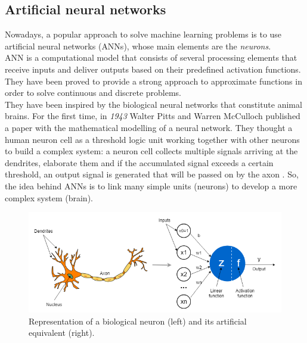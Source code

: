 \subsection{Artificial neural networks}
Nowadays, a popular approach to solve machine learning problems is to use artificial neural networks (\glspl{ANN}), whose main elements are the \emph{neurons}.\\

\gls{ANN} is a computational model that consists of several processing elements that receive inputs and deliver outputs based on their predefined activation functions. They have been proved to provide a strong approach to approximate functions in order to solve continuous and discrete problems. \\

They have been inspired by the biological neural networks that constitute animal brains. For the first time, in \emph{1943} Walter Pitts and Warren McCulloch published a paper with the mathematical modelling of a neural network. They thought a human neuron cell as a threshold logic unit working together with other neurons to build a complex system: a neuron cell collects multiple signals arriving at the dendrites, elaborate them and if the accumulated signal exceeds a certain threshold, an output signal is generated that will be passed on by the axon \cite{McCulloch1943}. So, the idea behind \glspl{ANN} is to link many simple units (neurons) to develop a more complex system (brain).

\begin{figure}[H]
\centering
    \includegraphics[width=.8\linewidth]{images/Background/ML/Perceptron.png}
\caption[Perceptron representation]{Representation of a biological neuron (left) and its artificial equivalent (right).}
\label{fig:linsep}
\end{figure}


